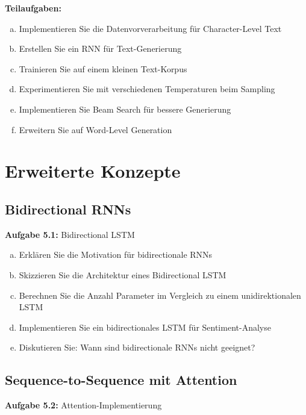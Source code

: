 \documentclass[12pt,a4paper]{article}
\begin{document}
\textbf{Teilaufgaben:}
\begin{enumerate}[(a)]
    \item Implementieren Sie die Datenvorverarbeitung für Character-Level Text
    \item Erstellen Sie ein RNN für Text-Generierung
    \item Trainieren Sie auf einem kleinen Text-Korpus
    \item Experimentieren Sie mit verschiedenen Temperaturen beim Sampling
    \item Implementieren Sie Beam Search für bessere Generierung
    \item Erweitern Sie auf Word-Level Generation
\end{enumerate}

\section{Erweiterte Konzepte}

\subsection{Bidirectional RNNs}

\textbf{Aufgabe 5.1:} Bidirectional LSTM

\begin{enumerate}[(a)]
    \item Erklären Sie die Motivation für bidirectionale RNNs
    \item Skizzieren Sie die Architektur eines Bidirectional LSTM
    \item Berechnen Sie die Anzahl Parameter im Vergleich zu einem unidirektionalen LSTM
    \item Implementieren Sie ein bidirectionales LSTM für Sentiment-Analyse
    \item Diskutieren Sie: Wann sind bidirectionale RNNs nicht geeignet?
\end{enumerate}

\subsection{Sequence-to-Sequence mit Attention}

\textbf{Aufgabe 5.2:} Attention-Implementierung
\end{document}
